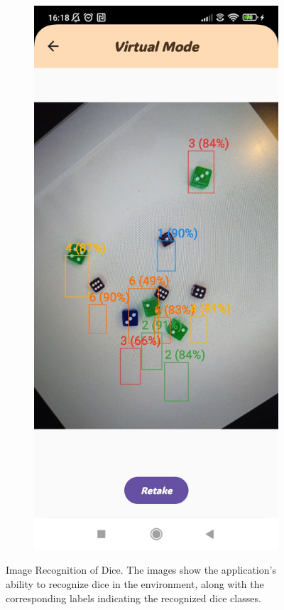\begin{figure}[ht!]
\begin{subfigure}[b]{0.27\textwidth}
    \end{subfigure}
    \hfill
    \begin{subfigure}[b]{0.27\textwidth}
        \includegraphics[width=\textwidth]{img/virtual screen3.jpg}
    \end{subfigure}   
    \caption{Image Recognition of Dice. The images show the application’s ability to recognize dice in the environment, along with the corresponding labels indicating the recognized dice classes.}
\end{figure}


